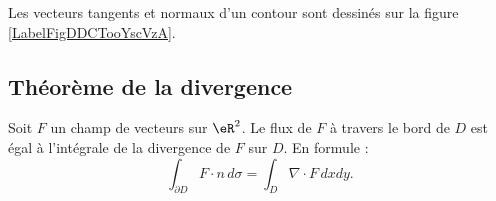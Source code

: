 Les vecteurs tangents et normaux d'un contour sont dessinés sur la figure \ref{LabelFigDDCTooYscVzA}.

\newcommand{\CaptionFigDDCTooYscVzA}{Le champ de vecteurs tangents est dessiné en rouge tandis qu'en vert nous avons le champ de vecteurs normaux extérieurs.}


\subsection{Théorème de la divergence}

\begin{theorem}
    Soit $F$ un champ de vecteurs sur $\eR^2$. Le flux de $F$ à travers le bord de $D$ est égal à l'intégrale de la divergence de $F$ sur $D$. En formule :
    \begin{equation}
        \int_{\partial D} F\cdot n\,d\sigma=\int_D\nabla\cdot F\,dxdy.
    \end{equation}
\end{theorem}

